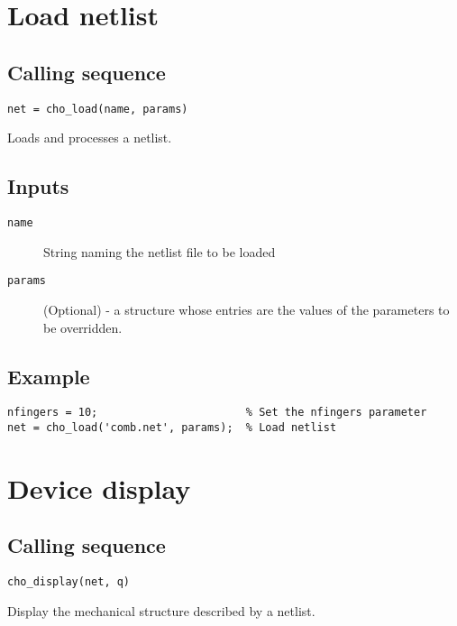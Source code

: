 
\section{Load netlist}

\subsection*{Calling sequence}

\begin{verbatim}
net = cho_load(name, params)
\end{verbatim}

Loads and processes a netlist.

\subsection*{Inputs}

\begin{description}
\item[\texttt{name}]
  String naming the netlist file to be loaded
\item[\texttt{params}]
  (Optional) - a structure whose entries are the values of the parameters
  to be overridden.
\end{description}

\subsection*{Example}

\begin{verbatim}
nfingers = 10;                       % Set the nfingers parameter
net = cho_load('comb.net', params);  % Load netlist 
\end{verbatim}



\section{Device display}

\subsection*{Calling sequence}

\begin{verbatim}
cho_display(net, q)
\end{verbatim}

Display the mechanical structure described by a netlist.

